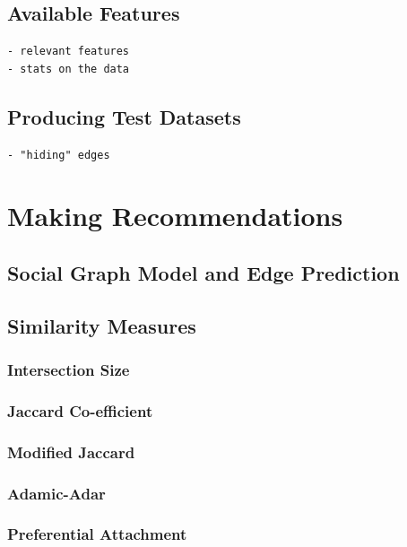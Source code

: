 \documentclass[a4paper,12pt,twoside,notitlepage]{report}
\begin{document}
\subsection{Available Features}
\begin{verbatim}
- relevant features
- stats on the data
\end{verbatim}

\subsection{Producing Test Datasets}
\begin{verbatim}
- "hiding" edges
\end{verbatim}

\section{Making Recommendations}

\subsection{Social Graph Model and Edge Prediction}

\subsection{Similarity Measures}

\subsubsection{Intersection Size}

\subsubsection{Jaccard Co-efficient}

\subsubsection{Modified Jaccard}

\subsubsection{Adamic-Adar}

\subsubsection{Preferential Attachment}
\end{document}
